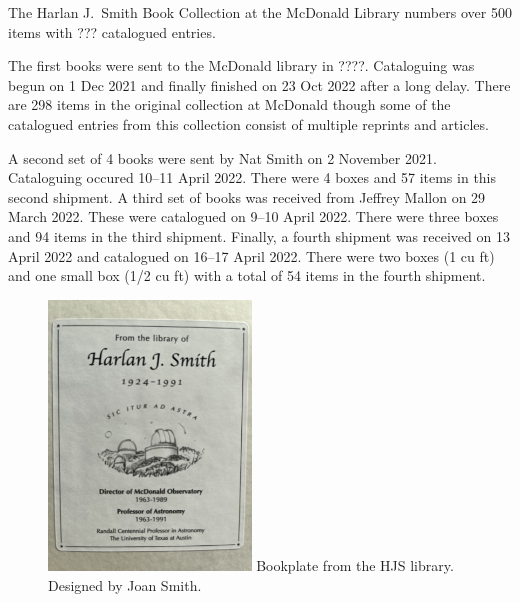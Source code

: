 

The Harlan J.~Smith Book Collection at the McDonald Library
numbers over 500 items with ??? catalogued entries.

The first books were sent to the McDonald library in ????.
Cataloguing was begun on 1 Dec 2021 and finally finished on 23 Oct
2022 after a long delay. There are 298 items in the original
collection at McDonald though some of the catalogued entries from this
collection consist of multiple reprints and articles.

A second set of 4 books were sent by Nat Smith on 2 November 2021.
Cataloguing occured 10--11 April 2022. There were 4 boxes and 57 items
in this second shipment. A third set of books was received from
Jeffrey Mallon on 29 March 2022. These were catalogued on 9--10 April
2022. There were three boxes and 94 items in the third
shipment. Finally, a fourth shipment was received on 13 April 2022 and
catalogued on 16--17 April 2022. There were two boxes (1 cu ft) and
one small box (1/2 cu ft) with a total of 54 items in the fourth
shipment.

\begin{figure}
  \centering
  \includegraphics[width=0.48\textwidth]{hjs_bookplate_small.png}
  Bookplate from the HJS library. Designed by Joan Smith.
  \label{fig:bookplate}
\end{figure}

